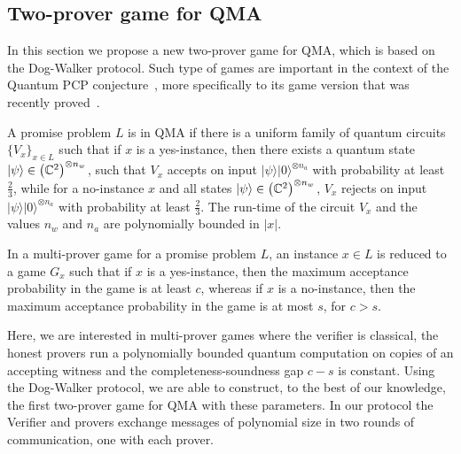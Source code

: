 \documentclass{toc}
\newcommand{\ket}[1]{|#1\rangle}
\begin{document}


\subsection{Two-prover game for QMA}\label{sec:qma}

In this section we propose a new two-prover game for QMA, which is based on the Dog-Walker
protocol. Such type of games are important in the context of the Quantum PCP conjecture~\cite{AharonovAV13}, more specifically to its game version that was recently proved~\cite{NatarajanV18}.


A promise problem $L$ is in QMA if there is a uniform family
of quantum circuits $\{V_x\}_{x \in L}$ such that if $x$ is a yes-instance, then there exists a
quantum state $\ket{\psi} \in \left(\C^2\right)^{\otimes n_w}$, such that
$V_x$  accepts on input $\ket{\psi}\ket{0}^{\otimes n_a}$ with probability at least
$\frac{2}{3}$, while for a no-instance $x$ and  all states $\ket{\psi} \in
\left(\C^2\right)^{\otimes n_w}$, $V_x$
rejects on input $\ket{\psi}\ket{0}^{\otimes n_a}$ with probability at
least $\frac{2}{3}$. The run-time of the circuit $V_x$ and the values $n_w$ and $n_a$ are polynomially bounded in $|x|$.

 In a multi-prover game for a promise problem $L$, an
 instance $x \in L$ is reduced to a game $G_x$ such that if $x$ is a yes-instance, then the maximum
 acceptance probability in the game is at least $c$, whereas if $x$ is a
 no-instance,
 then the maximum acceptance probability in the game is  at most $s$, for $c
 > s$.

Here, we are interested in multi-prover games where the verifier is classical,
 the honest provers run a polynomially bounded quantum computation on copies
 of an accepting witness and the completeness-soundness gap $c-s$ is constant.
Using the Dog-Walker protocol, we are able to construct, to the best of our knowledge, the first two-prover
game for QMA with these parameters. In our protocol the Verifier and provers exchange messages of polynomial size 
in two rounds of communication, one with each prover.
\end{document}
